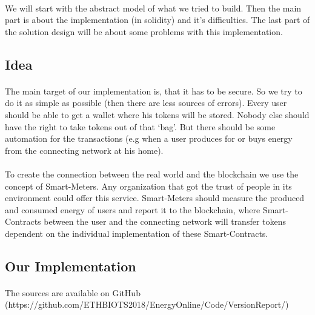 \documentclass{scrartcl}
\begin{document}
   \paragraph{}
   We will start with the abstract model of what we tried to build. Then the main part is about the implementation (in solidity) and it’s difficulties. The last part of the solution design will be about some problems with this implementation.
   
\subsection{Idea}
   
   \paragraph{}
   The main target of our implementation is, that it has to be secure. So we try to do it as simple as possible (then there are less sources of errors). Every user should be able to get a wallet where his tokens will be stored. Nobody else should have the right to take tokens out of that ‘bag’. But there should be some automation for the transactions (e.g when a user produces for or buys energy from the connecting network at his home).
	
	\paragraph{}
	To create the connection between the real world and the blockchain we use the concept of Smart-Meters. Any organization that got the trust of people in its environment could offer this service. Smart-Meters should measure the produced and consumed energy of users and report it to the blockchain, where Smart-Contracts between the user and the connecting network will transfer tokens dependent on the individual implementation of these Smart-Contracts.
	
	\subsection{Our Implementation}
	
	\paragraph{}
	The sources are available on GitHub (https://github.com/ETHBIOTS2018/EnergyOnline/Code/VersionReport/)
	
\end{document}
